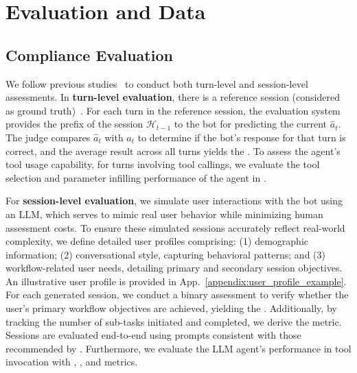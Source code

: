 \section{Evaluation and Data}

\tableExpSession
\tableExpSessionOOW

\subsection{Compliance Evaluation}
\label{subsec:eval_method}

We follow previous studies~\citep{FlowBench,AutoAgents} to conduct both turn-level and session-level assessments.
In \textbf{turn-level evaluation}, there is a reference session (considered as ground truth)~\citep{CGoDial}.
For each turn in the reference session, the evaluation system provides the prefix of the session $\mathcal{H}_{t-1}$ to the bot for predicting the current $\hat{a}_{t}$.
The judge compares $\hat{a}_{t}$ with $a_{t}$ to determine if the bot's response for that turn is correct, and the average result across all turns yields the . 
To assess the agent's tool usage capability, for turns involving tool callings, we evaluate the tool selection and parameter infilling performance of the agent in .


For \textbf{session-level evaluation}, we simulate user interactions with the bot using an LLM, which serves to mimic real user behavior while minimizing human assessment costs. 
To ensure these simulated sessions accurately reflect real-world complexity, we define detailed user profiles comprising: (1) demographic information; (2) conversational style, capturing behavioral patterns; and (3) workflow-related user needs, detailing primary and secondary session objectives. 
An illustrative user profile is provided in App.~\ref{appendix:user_profile_example}. For each generated session, we conduct a binary assessment to verify whether the user's primary workflow objectives are achieved, yielding the . Additionally, by tracking the number of sub-tasks initiated and completed, we derive the  metric. Sessions are evaluated end-to-end using prompts consistent with those recommended by \citet{FlowBench}. 
Furthermore, we evaluate the LLM agent’s performance in tool invocation with , , and  metrics.



